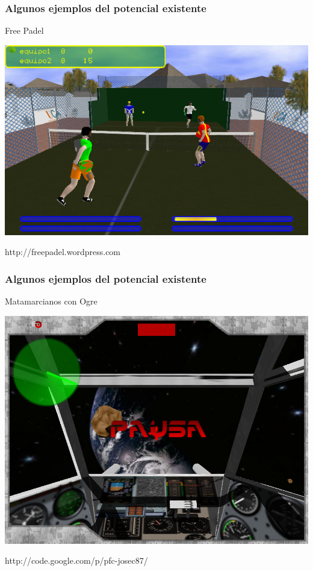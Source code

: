 
\begin{frame}
	\frametitle{Algunos ejemplos del potencial existente}
	
	\begin{center}
	Free Padel
	
		\includegraphics[scale=0.40]{img/freepadel.png}
		
	http://freepadel.wordpress.com
	\end{center}

\end{frame}


\begin{frame}
	\frametitle{Algunos ejemplos del potencial existente}
	
	\begin{center}
		Matamarcianos con Ogre
	
		\includegraphics[scale=0.28]{img/avion.png}
		
		http://code.google.com/p/pfc-josec87/
	\end{center}

\end{frame}

